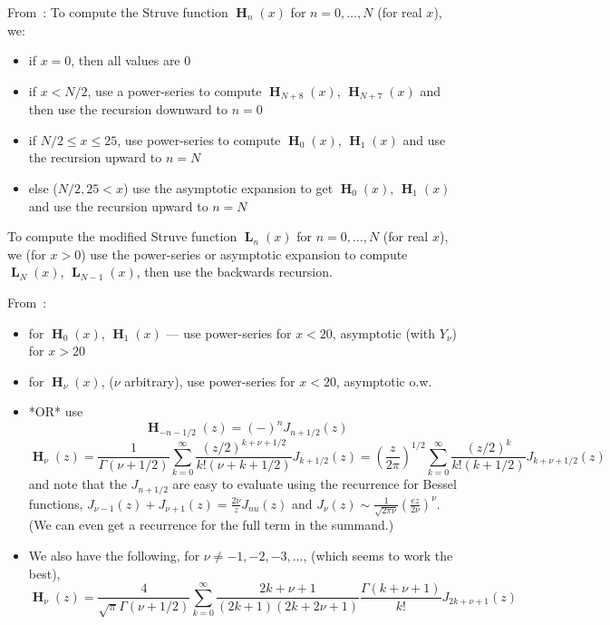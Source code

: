\documentclass[10pt,dvipdfmx,letterpaper,twoside]{article}
\newcommand{\Ob}[1]{\operatorname{\mathbf{#1}}}
\newenvironment{implementation}{\noindent\begin{framed}}{\end{framed}}
\let\Gam=\Gamma
\begin{document}
\begin{implementation}
From~\cite{atlas:thompson}:
To compute the Struve function $\Ob{H}_n(x)$ for $n=0,\dots,N$ (for real $x$), we:
\begin{itemize}
\item if $x=0$, then all values are $0$
\item if $x<N/2$, use a power-series to compute $\Ob{H}_{N+8}(x)$, $\Ob{H}_{N+7}(x)$ and then use the recursion
    downward to $n=0$
\item if $N/2\leq x\leq25$, use power-series to compute $\Ob{H}_0(x)$, $\Ob{H}_1(x)$ and use the recursion upward to $n=N$
\item else ($N/2,25<x$) use the asymptotic expansion to get $\Ob{H}_0(x)$, $\Ob{H}_1(x)$ and use the recursion upward to $n=N$
\end{itemize}
To compute the modified Struve function $\Ob{L}_n(x)$ for $n=0,\dots,N$ (for real $x$), we (for $x>0$) use the power-series or
asymptotic expansion to compute $\Ob{L}_{N}(x)$, $\Ob{L}_{N-1}(x)$, then use the backwards recursion.

From~\cite{zj}:
\begin{itemize}
\item for $\Ob{H}_0(x)$, $\Ob{H}_1(x)$ --- use power-series for $x<20$, asymptotic (with $Y_\nu$) for $x>20$
\item for $\Ob{H}_\nu(x)$, ($\nu$ arbitrary), use power-series for $x<20$, asymptotic o.w.
\item *OR* use
    \[ \Ob{H}_{-n-1/2}(z) = (-)^nJ_{n+1/2}(z) \]
    \[ \Ob{H}_{\nu}(z) = \frac{1}{\Gam(\nu+1/2)}\sum_{k=0}^\infty \frac{(z/2)^{k+\nu+1/2}}{k!(\nu+k+1/2)}J_{k+1/2}(z)
        = \left(\frac{z}{2\pi}\right)^{1/2} \sum_{k=0}^\infty \frac{(z/2)^k}{k!(k+1/2)} J_{k+\nu+1/2}(z) \]
    and note that the $J_{n+1/2}$ are easy to evaluate using the recurrence for Bessel functions,
    $J_{\nu-1}(z)+J_{\nu+1}(z)=\frac{2\nu}{z}J_{nu}(z)$ and $J_\nu(z)\sim\frac{1}{\sqrt{2\pi\nu}}(\frac{ez}{2\nu})^\nu$.
    (We can even get a recurrence for the full term in the summand.)
\item We also have the following, for $\nu\neq-1,-2,-3,\dots$, (which seems to work the best), 
    \[ \Ob{H}_{\nu}(z) = \frac{4}{\sqrt\pi \Gam(\nu+1/2)} \sum_{k=0}^\infty \frac{2k+\nu+1}{(2k+1)(2k+2\nu+1)} \frac{\Gam(k+\nu+1)}{k!} J_{2k+\nu+1}(z) \]
\end{itemize}
\end{implementation}

\end{document}
